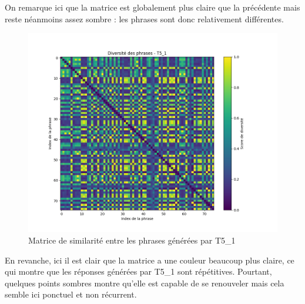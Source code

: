 \documentclass[11pt]{article}
\begin{document}
\vspace{5mm}

On remarque ici que la matrice est globalement plus claire que la précédente mais reste néanmoins assez sombre : les phrases sont donc relativement différentes.

\vspace{5mm}

\begin{figure}[H]
\centering
\includegraphics[width=1\textwidth]{../plot/diversity_matrix_t5_1.png}
\caption{Matrice de similarité entre les phrases générées par T5\_1}
\end{figure}

\vspace{5mm}

En revanche, ici il est clair que la matrice a une couleur beaucoup plus claire, ce qui montre que les réponses générées par T5\_1 sont répétitives. Pourtant, quelques points sombres montre qu'elle est capable de se renouveler mais cela semble 
ici ponctuel et non récurrent.

\vspace{5mm}
\end{document}
